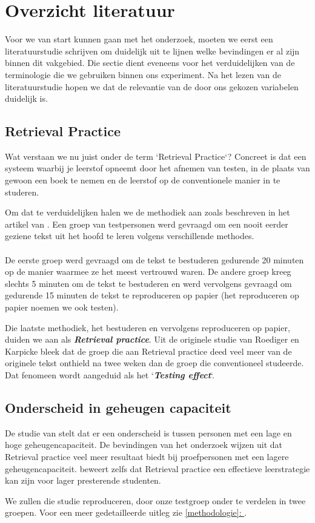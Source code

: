\documentclass{hogent-article}
\newcommand{\boldit}[1]{\emph{\textbf{#1}}}
\newcommand{\customref}[1]{\underline{\ref{#1}: \nameref{#1}}}
\begin{document}
\section{Overzicht literatuur}

Voor we van start kunnen gaan met het onderzoek, moeten we eerst een literatuurstudie schrijven om duidelijk uit te lijnen welke bevindingen er al zijn binnen dit vakgebied. Die sectie dient eveneens voor het verduidelijken van de terminologie die we gebruiken binnen ons experiment. Na het lezen van de literatuurstudie hopen we dat de relevantie van de door ons gekozen variabelen duidelijk is.

\subsection{Retrieval Practice}
\label{RetrievalPractice}
Wat verstaan we nu juist onder de term `Retrieval Practice`? Concreet is dat een systeem waarbij je leerstof opneemt door het afnemen van testen, in de plaats van gewoon een boek te nemen en de leerstof op de conventionele manier in te studeren.\\
\par
\noindent
Om dat te verduidelijken halen we de methodiek aan zoals beschreven in het artikel van \textcite{Roediger_2006}. Een groep van testpersonen werd gevraagd om een nooit eerder geziene tekst uit het hoofd te leren volgens verschillende methodes.\\\\De eerste groep werd gevraagd om de tekst te bestuderen gedurende 20 minuten op de manier waarmee ze het meest vertrouwd waren. De andere groep kreeg slechts 5 minuten om de tekst te bestuderen en werd vervolgens gevraagd om gedurende 15 minuten de tekst te reproduceren op papier (het reproduceren op papier noemen we ook testen).\\

\par
\noindent
Die laatste methodiek, het bestuderen en vervolgens reproduceren op papier, duiden we aan als \boldit{Retrieval practice}. Uit de originele studie van Roediger en Karpicke bleek dat de groep die aan Retrieval practice deed veel meer van de originele tekst onthield na twee weken dan de groep die conventioneel studeerde. Dat fenomeen wordt aangeduid als het `\boldit{Testing effect}`.

\subsection{Onderscheid in geheugen capaciteit}
\label{geheugencapaciteit}
De studie van \textcite{Agarwal_2016} stelt dat er een onderscheid is tussen personen met een lage en hoge geheugencapaciteit. De bevindingen van het onderzoek wijzen uit dat Retrieval practice veel meer resultaat biedt bij proefpersonen met een lagere geheugencapaciteit. \textcite{Agarwal_2016} beweert zelfs dat Retrieval practice een effectieve leerstrategie kan zijn voor lager presterende studenten.\\
\par
\noindent
We zullen die studie reproduceren, door onze testgroep onder te verdelen in twee groepen. Voor een meer gedetailleerde uitleg zie \customref{methodologie}.
\end{document}
